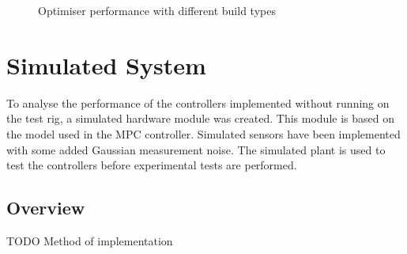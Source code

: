 \documentclass[11pt,a4paper]{article}
\begin{document}
\begin{figure}[hbt!]
    \centering
    \caption{Optimiser performance with different build types}
    \label{fig:optimiser_process_time}
\end{figure}


\clearpage
\section{Simulated System}
\label{sub:simulated_system}
To analyse the performance of the controllers implemented without running on the test rig, a simulated hardware module was created. This module is based on the \cite{hosovsky_2012} model used in the MPC controller. Simulated sensors have been implemented with some added Gaussian measurement noise. The simulated plant is used to test the controllers before experimental tests are performed.

\subsection{Overview}
\label{sub:simulation_overview}
TODO Method of implementation\newline
\end{document}
